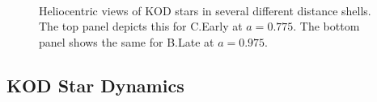 \begin{figure}
    \centering
  	\\
	\caption{Heliocentric views of KOD stars in several different
          distance shells. The top panel depicts this for C.Early at
          $a=0.775$. The bottom panel shows the same for B.Late at
          $a=0.975$.}
\end{figure}

\subsection{KOD Star Dynamics} \label{ssec:kud_dynamics}

